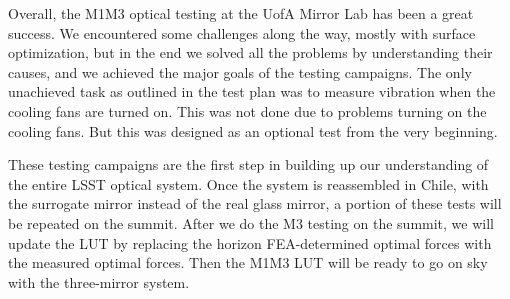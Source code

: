 \documentclass [twoside,openbib,12pt]{article}
\begin{document}
Overall, the M1M3 optical testing at the UofA Mirror Lab has been a
great success. We encountered some challenges along the way, mostly
with surface optimization, but in the end we solved all the problems
by understanding their causes, and we achieved the major goals of the
testing campaigns. The only unachieved task as outlined in the test
plan was to measure vibration when the cooling fans are turned
on. This was not done due to problems turning on the cooling fans. But
this was designed as an optional test from the very beginning.

These testing campaigns are the 
first step in building up our understanding of the entire LSST optical system.
Once the system is reassembled in Chile, with the surrogate mirror
instead of the real glass mirror, a portion of these tests will be
repeated on the summit.
After we do the M3 testing on the summit, we will update the LUT by
replacing the horizon FEA-determined optimal forces with the measured
optimal forces. Then the M1M3 LUT will be ready to go on sky with the
three-mirror system.


\end{document}
